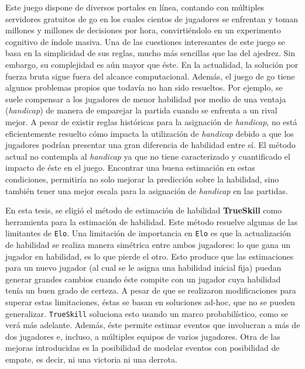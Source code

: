 \documentclass[11pt,twoside,spanish]{report} %
\begin{document}
Este juego dispone de diversos portales en l\'inea, contando con m\'ultiples servidores gratuitos de go en los cuales cientos de jugadores se enfrentan y toman millones y millones de decisiones por hora, convirti\'endolo en un experimento cognitivo de \'indole masiva.
Una de las cuestiones interesantes de este juego se basa en la simplicidad de sus reglas, mucho m\'as sencillas que las del ajedrez.
Sin embargo, su complejidad es a\'un mayor que \'este.
En la actualidad, la soluci\'on por fuerza bruta sigue fuera del alcance computacional.
Adem\'as, el juego de go tiene algunos problemas propios que todav\'ia no han sido resueltos.
Por ejemplo, se suele compensar a los jugadores de menor habilidad por medio de una ventaja (\emph{handicap}) de manera de emparejar la partida cuando se enfrenta a un rival mejor.
A pesar de existir reglas hist\'oricas para la asignaci\'on de \emph{handicap}, no est\'a eficientemente resuelto c\'omo impacta la utilizaci\'on de \emph{handicap} debido a que los jugadores podr\'ian presentar una gran diferencia de habilidad entre s\'i.
El m\'etodo actual no contempla al \emph{handicap} ya que no tiene caracterizado y cuantificado el impacto de \'este en el juego.
Encontrar una buena estimaci\'on en estas condiciones, permitir\'ia no solo mejorar la predicci\'on sobre la habilidad, sino tambi\'en tener una mejor escala para la asignaci\'on de \emph{handicap} en las partidas.

En esta tesis, se eligi\'o el m\'etodo de estimaci\'on de habilidad \textbf{TrueSkill} como herramienta para la estimaci\'on de habilidad.
Este m\'etodo resuelve algunas de las limitantes de \texttt{Elo}.
Una limitaci\'on de importancia en \texttt{Elo} es que la actualizaci\'on de habilidad se realiza manera sim\'etrica entre ambos jugadores: lo que gana un jugador en habilidad, es lo que pierde el otro.
Esto produce que las estimaciones para un nuevo jugador (al cual se le asigna una habilidad inicial fija) puedan generar grandes cambios cuando \'este compite con un jugador cuya habilidad ten\'ia un buen grado de certeza.
A pesar de que se realizaron modificaciones para superar estas limitaciones, \'estas se basan en soluciones ad-hoc, que no se pueden generalizar.
\texttt{TrueSkill} soluciona esto usando un marco probabil\'istico, como se ver\'a m\'as adelante.
Adem\'as, \'este permite estimar eventos que involucran a m\'as de dos jugadores e, incluso, a m\'ultiples equipos de varios jugadores.
Otra de las mejoras introducidas es la posibilidad de modelar eventos con posibilidad de empate, es decir, ni una victoria ni una derrota.
\end{document}
